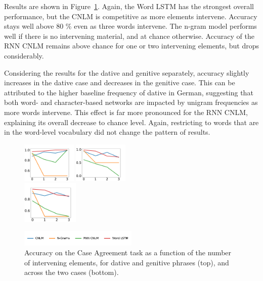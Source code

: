 Results are shown in Figure~\ref{fig:case}.
Again, the Word LSTM has the strongest overall performance, but the CNLM is competitive as more elements intervene. Accuracy stays well above 80 \% even as three words intervene.
The n-gram model performs well if there is no intervening material, and at chance otherwise.
Accuracy of the RNN CNLM remains above chance for one or two intervening elements, but drops considerably.

Considering the results for the dative and genitive separately, accuracy slightly increases in the dative case and decreases in the genitive case.
This can be attributed to the higher baseline frequency of dative in German, suggesting that both word- and character-based networks are impacted by unigram frequencies as more words intervene.
This effect is far more pronounced for the RNN CNLM, explaining its overall decrease to chance level.
Again, restricting to words that are in the word-level vocabulary did not change the pattern of results.
\begin{figure}
\includegraphics[width=0.23\textwidth]{figures/german-case-Dative.pdf}
\includegraphics[width=0.23\textwidth]{figures/german-case-Genitive.pdf} \\

\centering\includegraphics[width=0.24\textwidth]{figures/german-case-total.pdf}

\includegraphics[width=0.5\textwidth]{figures/german-legend.pdf}
	\caption{Accuracy on the Case Agreement task as a function of the number of intervening elements, for dative and genitive phrases (top), and across the two cases (bottom).}\label{fig:case}
\end{figure}

